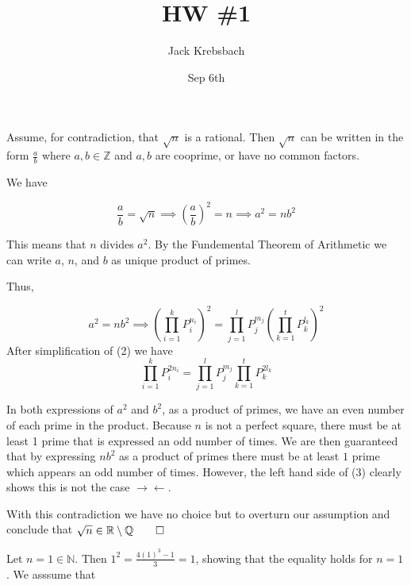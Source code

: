 \documentclass{report}
\title{HW \#1}
\author{Jack Krebsbach }
\date{Sep 6th}
\begin{document}
\maketitle

\sol Assume, for contradiction, that $\sqrt{n}$ is a rational. Then $\sqrt{n}$ can be written in the form $\frac{a}{b}$ where $a,b \in \mathbb{Z}$ and $a,b$ are cooprime, or have no common factors. 

We have 


\begin{equation}
  \frac{a}{b} = \sqrt{n} \implies
  \left(\frac{a}{b}\right)^{2} = n \implies a^2 = n b^2
\end{equation}


This means that $n$ divides $a^{2}$. 
By the Fundemental Theorem of Arithmetic we can write $a$, $n$, and $b$ as  unique product of primes. 

Thus, 

\begin{equation}
 a^2 = n b^2 \implies
 \left(\prod^{k}_{i = 1} P_{i}^{n_i}\right)^2  = \prod_{j = 1}^{l} P_{j}^{m_j}\left(\prod^{t}_{k = 1} P_{k}^{l_k}\right)^2 
\end{equation}
After simplification of (2) we have
\begin{equation}
     \prod^{k}_{i = 1} P_{i}^{2n_i}  = \prod_{j = 1}^{l} P_{j}^{m_j}\prod^{t}_{k = 1} P_{k}^{2l_k}
\end{equation}


In both expressions of $a^2$ and $b^2$, as a product of primes, we have an even number of each prime in the product. Because $n$ is not a perfect square, there must be at least 1 prime that is expressed an odd number of times. We are then guaranteed that by expressing $nb^2$ as a product of primes there must be at least $1$ prime which appears an odd number of times. However, the left hand side of (3) clearly shows this is not the case $\rightarrow\!\leftarrow.$

With this contradiction we have no choice but to overturn our assumption and conclude that $\sqrt{n} \in \mathbb{R} \setminus \mathbb{Q} \qed$

\bigskip
{}
\sol

Let $n=1 \in \mathbb{N}$. Then $1^2 =  \frac{4 (1)^{3}-1}{3} = 1$, showing that the equality holds for $n=1$. We asssume that 
\end{document}

